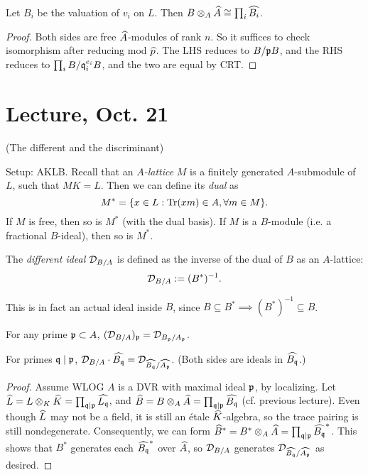 \documentclass[11pt]{amsart}
\begin{document}
\begin{prop}
Let $B_i$ be the valuation of $v_i$ on $L$. Then $B\otimes_A \widehat{A} \cong \prod_i \widehat{B_i}$.
\end{prop}

\begin{proof}
Both sides are free $\widehat{A}$-modules of rank $n$. So it suffices to check isomorphism after reducing mod $\widehat{p}$. The LHS reduces to $B/\mathfrak{p} B$, and the RHS reduces to $\prod_i B/\mathfrak{q}_i^{e_i} B$, and the two are equal by CRT.
\end{proof}


\section{Lecture, Oct. 21}

(The different and the discriminant)

Setup: AKLB. Recall that an \emph{$A$-lattice} $M$ is a finitely generated $A$-submodule of $L$, such that $MK = L$. Then we can define its \emph{dual} as
\[M^* = \{x\in L: \operatorname{Tr}(xm) \in A, \forall m\in M\}.\]
If $M$ is free, then so is $M^*$ (with the dual basis). If $M$ is a $B$-module (i.e. a fractional $B$-ideal), then so is $M^*$.

\begin{defn}
The \emph{different ideal} $\mathcal{D}_{B/A}$ is defined as the inverse of the dual of $B$ as an $A$-lattice: 
\[\mathcal{D}_{B/A} := (B^*)^{-1}.\]
\end{defn}

This is in fact an actual ideal inside $B$, since $B\subseteq B^* \implies (B^*)^{-1}\subseteq B$.

\begin{prop}
For any prime $\mathfrak{p}\subset A$, $(\mathcal{D}_{B/A})_{\mathfrak{p}} = \mathcal{D}_{B_{\mathfrak{p}}/A_{\mathfrak{p}}}$.
\end{prop}

\begin{prop}
For primes $\mathfrak{q}\mid \mathfrak{p}$, $\mathcal{D}_{B/A}\cdot \widehat{B_{\mathfrak{q}}} = \mathcal{D}_{\widehat{B_{\mathfrak{q}}}/\widehat{A_{\mathfrak{p}}}}$. (Both sides are ideals in $\widehat{B_{\mathfrak{q}}}$.)
\end{prop}

\begin{proof}
Assume WLOG $A$ is a DVR with maximal ideal $\mathfrak{p}$, by localizing. Let $\widehat{L} = L\otimes_K \widehat{K} = \prod_{\mathfrak{q}\mid\mathfrak{p}} \widehat{L_{\mathfrak{q}}}$, and $\widehat{B} = B\otimes_A \widehat{A} = \prod_{\mathfrak{q}\mid\mathfrak{p}} \widehat{B_{\mathfrak{q}}}$ (cf. previous lecture). Even though $\widehat{L}$ may not be a field, it is still an \'etale $\widehat{K}$-algebra, so the trace pairing is still nondegenerate. Consequently, we can form $\widehat{B}^* = B^* \otimes_A \widehat{A} =  \prod_{\mathfrak{q}\mid \mathfrak{p}} \widehat{B_{\mathfrak{q}}}^*$. This shows that $B^*$ generates each $\widehat{B_{\mathfrak{q}}}^*$ over $\widehat{A}$, so $\mathcal{D}_{B/A}$ generates $\mathcal{D}_{\widehat{B_{\mathfrak{q}}}/\widehat{A_{\mathfrak{p}}}}$ as desired.
\end{proof}
\end{document}
